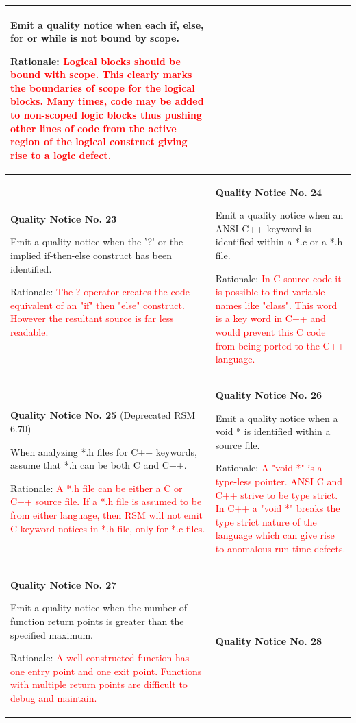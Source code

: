 {\begin{longtable}{||p{}|p{}||}
Emit a quality notice when each if, else, for
or while is not bound by scope.

Rationale:  \textcolor{red}{Logical blocks should be bound with scope.  This clearly marks the boundaries of scope for the logical blocks.  Many times, code may be added to non-scoped logic blocks thus pushing other lines of code from the active region of the logical construct giving rise to a logic defect.}
    \\
    \hline 
    \textbf{Quality Notice No. 23}
    
Emit a quality notice when the '?' or the implied
if-then-else construct has been identified.

Rationale:  \textcolor{red}{The ? operator creates the code equivalent of an "if" then "else" construct.  However the resultant source is far less readable.}
 & \textbf{Quality Notice No. 24}
 
Emit a quality notice when an ANSI C++ keyword is identified within a *.c or a *.h file.

Rationale: \textcolor{red}{ In C source code it is possible to find variable names like "class".  This word is a key word in C++ and would prevent this C code from being ported to the C++ language.}
    \\
    \hline
\textbf{Quality Notice No. 25} (Deprecated RSM 6.70) 

When analyzing *.h files for C++ keywords,
assume that *.h can be both C and C++.

Rationale: \textcolor{red}{ A *.h file can be either a C or C++ source file.  If a *.h file is assumed to be from either language, then RSM will not emit C keyword notices in *.h file, only for *.c files.}
 & \textbf{Quality Notice No. 26}
 
Emit a quality notice when a void * is identified
within a source file.

Rationale:  \textcolor{red}{A "void *" is a type-less pointer.  ANSI C and C++ strive to be type strict.  In C++ a "void *" breaks the type strict nature of the language which can give rise to anomalous run-time defects.}
    \\
    \hline
    \textbf{Quality Notice No. 27}
    
Emit a quality notice when the number of function return points is greater than the specified maximum.

Rationale:  \textcolor{red}{A well constructed function has one entry point and one exit point.  Functions with multiple return points are difficult to debug and maintain.}
 & \textbf{Quality Notice No. 28}
 

\end{longtable}}
